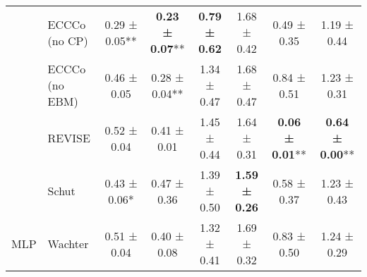 \begin{table}
{\begin{tabular}[t]{llcccccc}
 & ECCCo (no CP) & 0.29 ± 0.05** & \textbf{0.23 ± 0.07}** & \textbf{0.79 ± 0.62}\hphantom{*}\hphantom{*} & 1.68 ± 0.42\hphantom{*}\hphantom{*} & 0.49 ± 0.35\hphantom{*}\hphantom{*} & 1.19 ± 0.44\hphantom{*}\hphantom{*}\\

 & ECCCo (no EBM) & 0.46 ± 0.05\hphantom{*}\hphantom{*} & 0.28 ± 0.04** & 1.34 ± 0.47\hphantom{*}\hphantom{*} & 1.68 ± 0.47\hphantom{*}\hphantom{*} & 0.84 ± 0.51\hphantom{*}\hphantom{*} & 1.23 ± 0.31\hphantom{*}\hphantom{*}\\

 & REVISE & 0.52 ± 0.04\hphantom{*}\hphantom{*} & 0.41 ± 0.01\hphantom{*}\hphantom{*} & 1.45 ± 0.44\hphantom{*}\hphantom{*} & 1.64 ± 0.31\hphantom{*}\hphantom{*} & \textbf{0.06 ± 0.01}** & \textbf{0.64 ± 0.00}**\\

 & Schut & 0.43 ± 0.06*\hphantom{*} & 0.47 ± 0.36\hphantom{*}\hphantom{*} & 1.39 ± 0.50\hphantom{*}\hphantom{*} & \textbf{1.59 ± 0.26}\hphantom{*}\hphantom{*} & 0.58 ± 0.37\hphantom{*}\hphantom{*} & 1.23 ± 0.43\hphantom{*}\hphantom{*}\\

\multirow{-6}{*}{\raggedright\arraybackslash MLP} & Wachter & 0.51 ± 0.04\hphantom{*}\hphantom{*} & 0.40 ± 0.08\hphantom{*}\hphantom{*} & 1.32 ± 0.41\hphantom{*}\hphantom{*} & 1.69 ± 0.32\hphantom{*}\hphantom{*} & 0.83 ± 0.50\hphantom{*}\hphantom{*} & 1.24 ± 0.29\hphantom{*}\hphantom{*}\\
\bottomrule
\end{tabular}}
\end{table}
